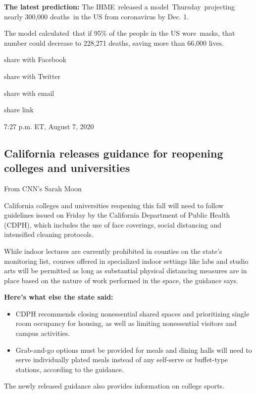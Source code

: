 \textbf{The latest prediction:} The IHME~released a
model~Thursday~projecting nearly 300,000 deaths~in the US from
coronavirus by Dec. 1.~

The model calculated~that if 95\% of the people in the US wore~masks,
that number could decrease to 228,271 deaths, saving more than 66,000
lives.

share with Facebook

share with Twitter

share with email

share link

7:27 p.m. ET, August 7, 2020

\hypertarget{california-releases-guidance-for-reopening-colleges-and-universities}{%
\subsection{California releases guidance for reopening colleges and
universities}\label{california-releases-guidance-for-reopening-colleges-and-universities}}

From CNN's Sarah Moon

California colleges and universities reopening this fall will need to
follow guidelines issued on Friday by the California Department of
Public Health (CDPH), which includes the use of face coverings, social
distancing and intensified cleaning protocols.

While indoor lectures are currently prohibited in counties on the
state's monitoring list, courses offered in specialized indoor settings
like labs and studio arts will be permitted as long as substantial
physical distancing measures are in place based on the nature of work
performed in the space, the guidance says.~

\textbf{Here's what else the state said:}

\begin{itemize}
\tightlist
\item
  CDPH recommends closing nonessential shared spaces and prioritizing
  single room occupancy for housing, as well as limiting nonessential
  visitors and campus activities.
\item
  Grab-and-go options must be provided for meals and dining halls will
  need to serve individually plated meals instead of any self-serve or
  buffet-type stations, according to the guidance.
\end{itemize}

The newly released guidance also provides information on college sports.

